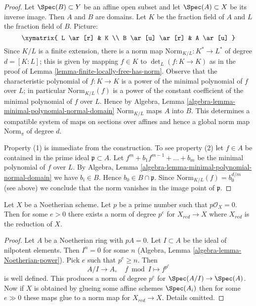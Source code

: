 \begin{proof}
Let $\Spec(B) \subset Y$ be an affine open subset and let
$\Spec(A) \subset X$ be its inverse image. Then $A$ and $B$
are domains. Let $K$ be the fraction
field of $A$ and $L$ the fraction field of $B$. Picture:
$$
\xymatrix{
L \ar[r] & K \\
B \ar[u] \ar[r] & A \ar[u]
}
$$
Since $K/L$ is a finite extension, there is a norm map
$\text{Norm}_{K/L} : K^* \to L^*$ of degree $d = [K : L]$; this is given by
mapping $f \in K$ to $\det_L(f : K \to K)$ as in the proof
of Lemma \ref{lemma-finite-locally-free-has-norm}.
Observe that the characteristic polynomial of $f : K \to K$
is a power of the minimal polynomial of $f$ over $L$;
in particular $\text{Norm}_{K/L}(f)$ is a power of the constant
coefficient of the minimal polynomial of $f$ over $L$. Hence by
Algebra, Lemma \ref{algebra-lemma-minimal-polynomial-normal-domain}
$\text{Norm}_{K/L}$ maps $A$ into $B$.
This determines a compatible system of maps
on sections over affines and hence a global norm map
$\text{Norm}_\pi$ of degree $d$.

\medskip\noindent
Property (1) is immediate from the construction.
To see property (2) let $f \in A$ be contained in the
prime ideal $\mathfrak p \subset A$. Let
$f^m + b_1 f^{m - 1} + \ldots + b_m$ be the minimal
polynomial of $f$ over $L$. By
Algebra, Lemma \ref{algebra-lemma-minimal-polynomial-normal-domain}
we have $b_i \in B$. Hence $b_0 \in B \cap \mathfrak p$.
Since $\text{Norm}_{K/L}(f) = b_0^{d/m}$ (see above)
we conclude that the norm vanishes in the image point of $\mathfrak p$.
\end{proof}

\begin{lemma}
\label{lemma-Frobenius-gives-norm-for-reduction}
Let $X$ be a Noetherian scheme. Let $p$ be a prime number such that
$p\mathcal{O}_X = 0$. Then for some $e > 0$ there exists a norm
of degree $p^e$ for $X_{red} \to X$ where $X_{red}$ is the reduction
of $X$.
\end{lemma}

\begin{proof}
Let $A$ be a Noetherian ring with $pA = 0$. Let $I \subset A$ be the
ideal of nilpotent elements. Then $I^n = 0$ for some $n$ (Algebra,
Lemma \ref{algebra-lemma-Noetherian-power}).
Pick $e$ such that $p^e \geq n$. Then
$$
A/I \longrightarrow A,\quad
f \bmod I \longmapsto f^{p^e}
$$
is well defined. This produces a norm of degree $p^e$ for
$\Spec(A/I) \to \Spec(A)$. Now if $X$ is obtained by glueing some
affine schemes $\Spec(A_i)$ then for some $e \gg 0$ these maps
glue to a norm map for $X_{red} \to X$. Details omitted.
\end{proof}

